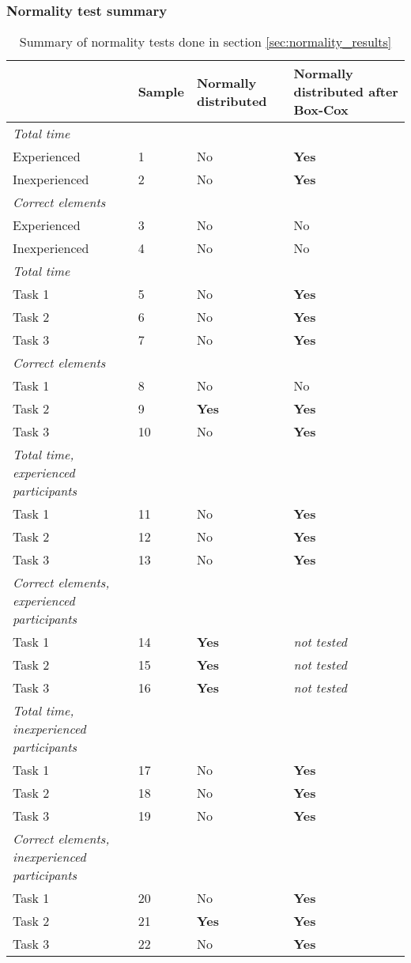\subsubsection{Normality test summary}\label{sec:normaltest_summary}

	\begin{longtable}{p{}|l|p{2cm}|p{}}
	\caption[Summary, normality tests]{Summary of normality tests done in section \ref{sec:normality_results}} \label{tab:normaltest_summary} \\
		  & Sample & Normally distributed  & Normally distributed after Box-Cox  \\ \hline
		\textit{Total time} & & & \\
		Experienced & 1 &No   & \textbf{Yes}   \\
		Inexperienced  & 2 & No & \textbf{Yes}     \\ \hline
		\textit{Correct elements} & & & \\
		Experienced & 3 & No  & No   \\
		Inexperienced  & 4 & No & No   \\ \hline
		\textit{Total time }& & & \\
		Task 1 & 5 &No  & \textbf{Yes}  \\
		Task 2 & 6 &No  & \textbf{Yes}   \\
		Task 3 & 7 & No & \textbf{Yes}  \\ \hline
		\textit{Correct elements} & & & \\
		Task 1 & 8 & No  & No  \\
		Task 2 & 9 &\textbf{Yes}  & \textbf{Yes}   \\
		Task 3 & 10 & No & \textbf{Yes}  \\ \hline
		\textit{Total time, experienced participants} & & & \\
		Task 1 & 11 & No  & \textbf{Yes}  \\
		Task 2 & 12 & No  & \textbf{Yes}   \\
		Task 3 & 13 & No & \textbf{Yes}  \\ \hline
		\textit{Correct elements, experienced participants} & & & \\
		Task 1 & 14 & \textbf{Yes}  & \textit{not tested} \\
		Task 2 & 15 & \textbf{Yes}  &  \textit{not tested} \\
		Task 3 & 16 & \textbf{Yes} & \textit{not tested} \\ \hline
		\textit{Total time, inexperienced participants} & & & \\
		Task 1 & 17& No  & \textbf{Yes}  \\
		Task 2 & 18 & No  & \textbf{Yes}   \\
		Task 3 & 19 & No & \textbf{Yes}  \\ \hline
		\textit{Correct elements, inexperienced participants} & & & \\
		Task 1 & 20 & No  & \textbf{Yes} \\
		Task 2 & 21 & \textbf{Yes}  & \textbf{Yes} \\
		Task 3 & 22 & No & \textbf{Yes} \\ \hline
	\end{longtable}

